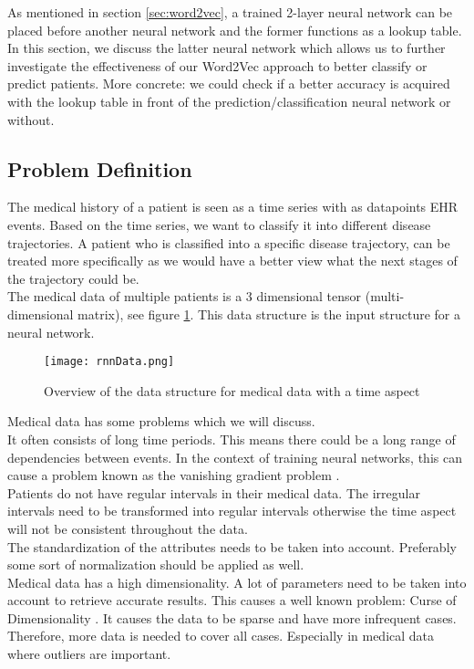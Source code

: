 As mentioned in section \ref{sec:word2vec}, a trained 2-layer neural network can be placed before another neural network and the former functions as a lookup table. In this section, we discuss the latter neural network which allows us to further investigate the effectiveness of our Word2Vec approach to better classify or predict patients. More concrete: we could check if a better accuracy is acquired with the lookup table in front of the prediction/classification neural network or without. 

\subsection{Problem Definition}
\label{sec:problem}

The medical history of a patient is seen as a time series with as datapoints EHR events. Based on the time series, we want to classify it into different disease trajectories. A patient who is classified into a specific disease trajectory, can be treated more specifically as we would have a better view what the next stages of the trajectory could be. \\

The medical data of multiple patients is a $3$ dimensional tensor (multi-dimensional matrix), see figure \ref{fig:rnnData}. This data structure is the input structure for a neural network.

\begin{figure}[!htb]
	\centering
	\texttt{[image: rnnData.png]}
	\caption{Overview of the data structure for medical data with a time aspect \cite{dl4jRnn:online}}
	\label{fig:rnnData}
\end{figure} 

Medical data has some problems which we will discuss.\\
It often consists of long time periods. This means there could be a long range of dependencies between events. In the context of training neural networks, this can cause a problem known as the vanishing gradient problem \cite{vanishingproblem:article}. \\
Patients do not have regular intervals in their medical data. The irregular intervals need to be transformed into regular intervals otherwise the time aspect will not be consistent throughout the data. \\
The standardization of the attributes needs to be taken into account. Preferably some sort of normalization should be applied as well. \\
Medical data has a high dimensionality. A lot of parameters need to be taken into account to retrieve accurate results. This causes a well known problem: Curse of Dimensionality \cite {curseofdim:book}. It causes the data to be sparse and have more infrequent cases. Therefore, more data is needed to cover all cases. Especially in medical data where outliers are important. 


